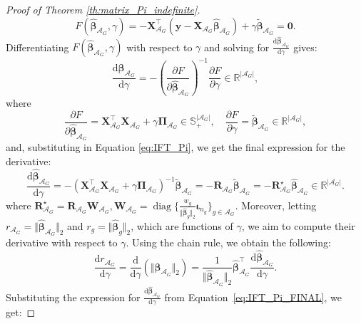 \documentclass[a4paper, 12pt]{article}
\newcommand{\Aset}{\mathcal{A}}
\newcommand{\betahat}{\widehat{\boldsymbol\beta}}
\DeclareMathOperator{\diag}{diag}
\newcommand{\T}{\top}
\def\bbeta{\boldsymbol{\beta}}
\def\bPi{\boldsymbol{\Pi}}
\def\by{\boldsymbol{y}}
\def\bR{\mathbf{R}}
\def\bW{\mathbf{W}}
\def\bX{\mathbf{X}}
\def\by{\mathbf{y}}
\begin{document}
\begin{appendix}
\begin{proof}[Proof of Theorem \ref{th:matrix_Pi_indefinite}]
\begin{equation*}
F(\widehat{\bbeta}_{\Aset_G}, \gamma) =-\bX_{\Aset_G}^{\T}\left(\by-\bX_{\Aset_G}\betahat_{\Aset_G}\right)+\gamma\widetilde{\bbeta}_{\Aset_G} =\boldsymbol{0}.
\end{equation*}
Differentiating $F(\widehat{\bbeta}_{\Aset_G}, \gamma)$ with respect to $\gamma$ and solving for $\frac{\mathrm{d}\widehat{\bbeta}_{\Aset_G}}{\mathrm{d} \gamma}$ gives:
\begin{equation}
\label{eq:IFT_Pi}
\frac{\mathrm{d}\widehat{\bbeta}_{\Aset_G}}{\mathrm{d}\gamma} = -\left( \frac{\partial F}{\partial \widehat{\bbeta}_{\Aset_G}} \right)^{-1}  \frac{\partial F}{\partial \gamma}\in\mathbb{R}^{\vert\Aset_G\vert},
\end{equation}
where
\begin{equation*}
\frac{\partial F}{\partial \widehat{\bbeta}_{\Aset_G}} = \bX_{\Aset_G}^{\T} \bX_{\Aset_G}+ \gamma \bPi_{\Aset_G}\in\mathbb{S}^{\vert\Aset_G\vert}_+,
\quad
\frac{\partial F}{\partial \gamma} =\widetilde{\bbeta}_{\Aset_G}\in\mathbb{R}^{\vert\Aset_G\vert},
\end{equation*}
and, substituting in Equation \eqref{eq:IFT_Pi}, we get the final expression for the derivative:
\begin{equation}
\label{eq:IFT_Pi_FINAL}
\frac{\mathrm{d}\widehat{\bbeta}_{\Aset_G}}{\mathrm{d}\gamma}
= -\left( \bX_{\Aset_G}^{\T} \bX_{\Aset_G} + \gamma \bPi_{\Aset_G} \right)^{-1}\widetilde{\bbeta}_{\Aset_G}=-\bR_{\Aset_G}\widetilde{\bbeta}_{\Aset_G}=-\bR_{\Aset_G}^\star\widehat{\bbeta}_{\Aset_G}\in\mathbb{R}^{\vert\Aset_G\vert}.
\end{equation}
where $\bR_{\Aset_G}^\star=\bR_{\Aset_G}\bW_{\Aset_G},\bW_{\Aset_G}=\diag\Big\{\frac{w_g}{\Vert\widehat{\bbeta}_{g}\Vert_2}\boldsymbol{\iota}_{n_g}\Big\}_{g\in\Aset_G}$. Moreover, letting $r_{\Aset_G} = \Vert \widehat{\bbeta}_{\Aset_G}\Vert_2$ and $r_g= \Vert \widehat{\bbeta}_{g}\Vert_2$, which are functions of $\gamma$, we aim to compute their derivative with respect to $\gamma$. Using the chain rule, we obtain the following:
\begin{equation*}
\frac{\mathrm{d}r_{\Aset_G}}{\mathrm{d}\gamma}
= \frac{\mathrm{d}}{\mathrm{d}\gamma} \left( \Vert \widehat{\bbeta}_{\Aset_G} \Vert_2 \right)
= \frac{1}{\Vert \widehat{\bbeta}_{\Aset_G} \Vert_2}\widehat{\bbeta}_{\Aset_G}^{\T} \frac{\mathrm{d}\widehat{\bbeta}_{\Aset_G}}{\mathrm{d}\gamma}.
\end{equation*}
Substituting the expression for \( \frac{\mathrm{d}\widehat{\bbeta}_{\Aset_G}}{\mathrm{d}\gamma} \) from Equation~\eqref{eq:IFT_Pi_FINAL}, we get:

\end{proof}
\end{appendix}
\end{document}
